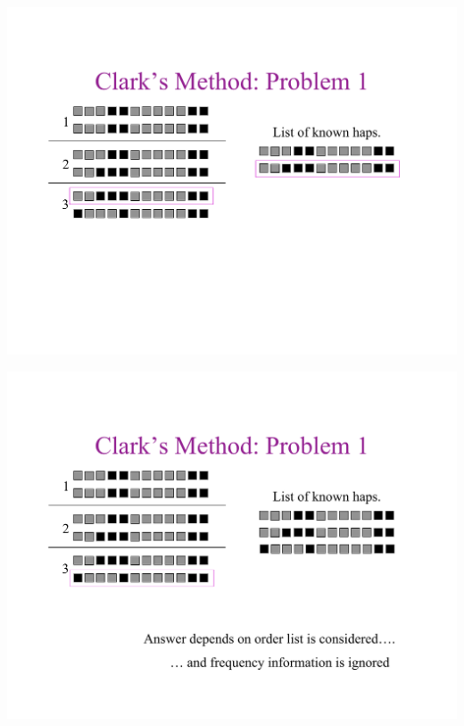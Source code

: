 \newslide{}
\mbox{}
\vspace*{\VertUp}
\enlargethispage*{1000pt}
\begin{center}
\includegraphics*[width=\textwidth]{PPT_pages/pg_0027.pdf}
\end{center}


\newslide{}
\mbox{}
\vspace*{\VertUp}
\enlargethispage*{1000pt}
\begin{center}
\includegraphics*[width=\textwidth]{PPT_pages/pg_0028.pdf}
\end{center}


